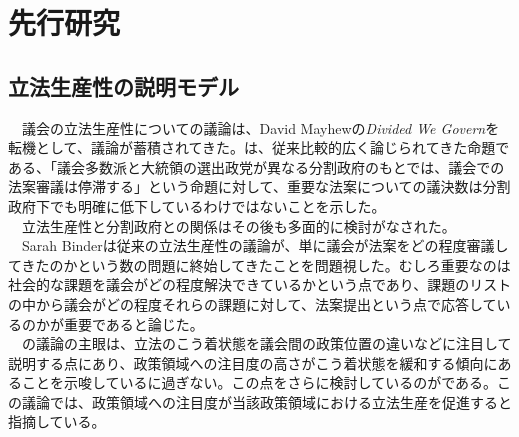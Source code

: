 \documentclass[here]{article}
\begin{document}
\section{先行研究}
\subsection{立法生産性の説明モデル}
　議会の立法生産性についての議論は、David Mayhewの\textit{Divided We Govern}を転機として、議論が蓄積されてきた。\citet*{Mayhew1991-rq}は、従来比較的広く論じられてきた命題である、「議会多数派と大統領の選出政党が異なる分割政府のもとでは、議会での法案審議は停滞する」という命題に対して、重要な法案についての議決数は分割政府下でも明確に低下しているわけではないことを示した。\\
　立法生産性と分割政府との関係はその後も多面的に検討がなされた。\\
　Sarah Binderは従来の立法生産性の議論が、単に議会が法案をどの程度審議してきたのかという数の問題に終始してきたことを問題視した。むしろ重要なのは社会的な課題を議会がどの程度解決できているかという点であり、課題のリストの中から議会がどの程度それらの課題に対して、法案提出という点で応答しているのかが重要であると論じた。\citep*{Binder2003-bn,Binder2017-wr}\\
　\citet*{Binder2003-bn}の議論の主眼は、立法のこう着状態を議会間の政策位置の違いなどに注目して説明する点にあり、政策領域への注目度の高さがこう着状態を緩和する傾向にあることを示唆しているに過ぎない。この点をさらに検討しているのが\citet*{Adler2013-ay}である。この議論では、政策領域への注目度が当該政策領域における立法生産を促進すると指摘している。\\
\end{document}
